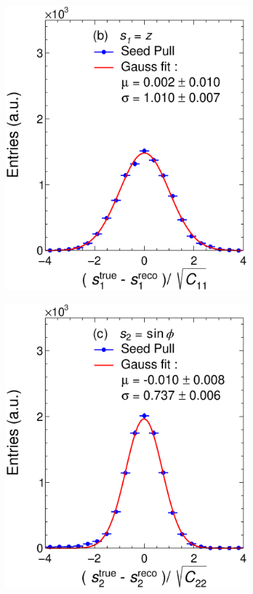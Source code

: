 \begin{figure}[!ht]
\begin{subfigure}{0.32\textwidth}
         \includegraphics[width=\textwidth]{figures/ch4-KF_NDGArLite/MC/ALICE+KF/UnitSeed_p1.eps}
         \caption{}
         \label{fig:resp1SeedGAr}
     \end{subfigure}
    \begin{subfigure}{0.32\textwidth}
         \centering
         \includegraphics[width=\textwidth]{figures/ch4-KF_NDGArLite/MC/ALICE+KF/UnitSeed_p2.eps}

\end{subfigure}
\end{figure}
